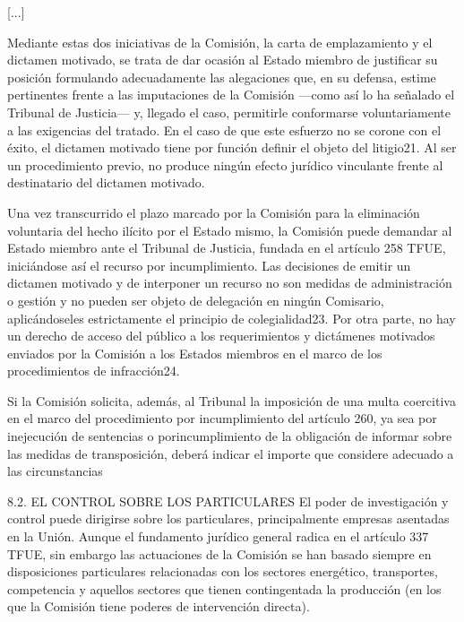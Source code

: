 \documentclass[10pt,a4paper]{article}
\begin{document}
[...]

Mediante estas dos iniciativas de la Comisión, la carta de emplazamiento y el dictamen motivado, se trata de dar ocasión al Estado miembro de justificar su posición formulando adecuadamente las alegaciones que, en su defensa, estime pertinentes frente a las imputaciones de la Comisión —como así lo ha señalado el Tribunal de Justicia— y, llegado el caso, permitirle conformarse voluntariamente a las exigencias del tratado. En el caso de que este esfuerzo no se corone con el éxito, el dictamen motivado tiene por función definir el objeto del litigio21. Al ser un  procedimiento previo, no produce ningún efecto jurídico vinculante frente al destinatario del dictamen motivado.

Una vez transcurrido el plazo marcado por la Comisión para la eliminación voluntaria del hecho ilícito por el Estado mismo, la Comisión puede demandar al Estado miembro ante el Tribunal de Justicia, fundada en el artículo 258 TFUE, iniciándose así el recurso por incumplimiento. Las decisiones de emitir un dictamen motivado y de interponer un recurso no son medidas de administración o gestión y no pueden ser objeto de delegación en ningún Comisario, aplicándoseles estrictamente el principio de colegialidad23. Por otra parte, no hay un derecho de acceso del público a los requerimientos y dictámenes motivados enviados por la Comisión a los Estados miembros en el marco de los procedimientos de infracción24.

Si la Comisión solicita, además, al Tribunal la imposición de una multa coercitiva en el marco del procedimiento por incumplimiento del artículo 260, ya sea por inejecución de sentencias o porincumplimiento de la obligación de informar sobre las medidas de transposición, deberá indicar el importe que considere adecuado a las circunstancias

8.2. EL CONTROL SOBRE LOS PARTICULARES
El poder de investigación y control puede dirigirse sobre los particulares, principalmente empresas asentadas en la Unión. Aunque el fundamento jurídico general radica en el artículo 337 TFUE, sin embargo las actuaciones de la Comisión se han basado siempre en disposiciones particulares relacionadas con los sectores energético, transportes, competencia y aquellos sectores que tienen contingentada la producción (en los que la Comisión tiene poderes de intervención directa).
\end{document}
